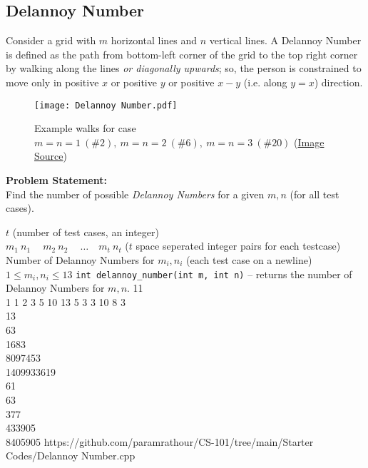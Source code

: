 \subsection{Delannoy Number}{\label{pp:delannoynumber}}
Consider a grid with $m$ horizontal lines and $n$ vertical lines. A Delannoy Number is defined as the path from bottom-left corner of the grid to the top right corner by walking along the lines \emph{or diagonally upwards}; so, the person is constrained to move only in positive $x$ or positive $y$ or positive $x-y$ (i.e. along $y=x$) direction.
\begin{figure}[H]
	\centering
	\texttt{[image: Delannoy Number.pdf]}
	\caption{Example walks for case $m=n=1\ (\#2),\ m=n=2\ (\#6),\ m=n=3\ (\#20)$ (\href{https://mathworld.wolfram.com/DelannoyNumber.html}{Image Source})}
	\label{fig:delannoynumber}
\end{figure}
\vspace{-1em}
\textbf{Problem Statement:}\\
Find the number of possible \emph{Delannoy Numbers} for a given $m,n$ (for all test cases).
\begin{testcasesFunction}
	{$t$ \hfill(number of test cases, an integer)\\
	$m_1\ n_1\ \quad m_2\ n_2\ \quad \ldots\quad m_t\ n_t$ \hfill($t$ space seperated integer pairs for each testcase)}
	{Number of Delannoy Numbers for $m_i, n_i$  \hfill(each test case on a newline)}
	{$1 \leq m_i, n_i \leq 13$}
	{\texttt{int delannoy\_number(int m, int n)} -- returns the number of Delannoy Numbers for $m,n$.}
	{11\\1 1 2 3 5 10 13 5 3 3 10 8}
	{3\\13\\63\\1683\\8097453\\1409933619\\61\\63\\377\\433905\\8405905}
	{https://github.com/paramrathour/CS-101/tree/main/Starter Codes/Delannoy Number.cpp}
\end{testcasesFunction}

